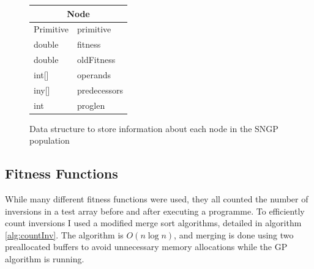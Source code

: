 \documentclass{article}
\begin{document}
\begin{figure}[h]
	\centering
	\begin{tabular}{|l l|}
		\hline
		\multicolumn{2}{|c|}{Node}\\
		\hline
		Primitive & primitive \\
		double & fitness\\
		double & oldFitness\\
		int[] & operands\\
		iny[] & predecessors\\
		int & proglen\\
		\hline
	\end{tabular}
	\caption{Data structure to store information about each node in the SNGP population}
	
	\label{struct:sngp_node}
\end{figure}

\subsection{Fitness Functions}

While many different fitness functions were used, they all counted the number of inversions in a test array before and after executing a programme. To efficiently count inversions I used a modified merge sort algorithms, detailed in algorithm \ref{alg:countInv}. The algorithm is $O(n\log{}n)$, and merging is done using two preallocated buffers to avoid unnecessary memory allocations while the GP algorithm is running.
\end{document}
